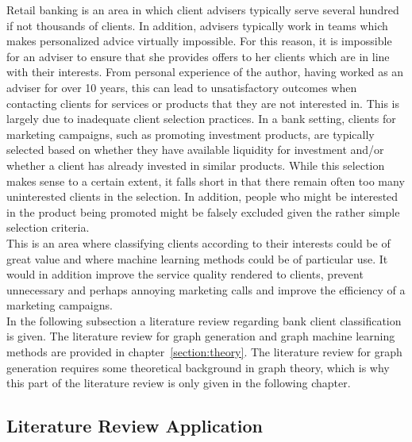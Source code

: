 	Retail banking is an area in which client advisers typically serve several 
	hundred if not thousands of clients. In addition, advisers typically work
	in teams which makes personalized advice virtually impossible. For this 
	reason, it is impossible for an adviser to ensure that she provides offers
	to her clients which are in line with their interests. From personal
	experience of the author, having worked as an adviser for over 10 years, 
	this can lead to unsatisfactory outcomes when contacting clients for services or 
	products that they are not interested in. This is largely due to inadequate
	client selection practices. In a bank setting, clients for marketing 
	campaigns, such as promoting investment products, are typically selected based
	on whether they have available liquidity for investment and/or whether a 
	client has already invested in similar products. While this selection makes
	sense to a certain extent, it falls short in that there remain often too 
	many uninterested clients in the selection. In addition, people who might 
	be interested in the product being promoted might be falsely excluded given 
	the rather simple selection criteria. \\
	

	\noindent This is an area where classifying clients according to their 
	interests could be of great value and where machine learning methods could 
	be of particular use. It would in addition improve the service quality 
	rendered to clients, prevent unnecessary and perhaps annoying marketing 
	calls and improve the efficiency of a marketing campaigns. \\

	\noindent In the following subsection a literature review regarding bank
	client classification is given. The literature review for graph generation
	and graph machine learning methods are provided in
	chapter~\ref{section:theory}. The literature review for graph generation
	requires some theoretical background in graph theory, which is why this
	part of the literature review is only given in the following chapter.  
	
	\subsection{Literature Review Application}

